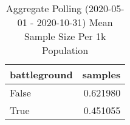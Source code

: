 \begin{table}
\centering
\caption{Aggregate Polling (2020-05-01 - 2020-10-31) Mean Sample Size Per 1k Population}
\label{table:aggregate\_polling\_2020-05-01\_-\_2020-10-31\_mean\_sample\_size\_per\_1k\_population}
\begin{tabular}{lr}
\toprule
 battleground &   samples \\
\midrule
        False &  0.621980 \\
         True &  0.451055 \\
\bottomrule
\end{tabular}
\end{table}
